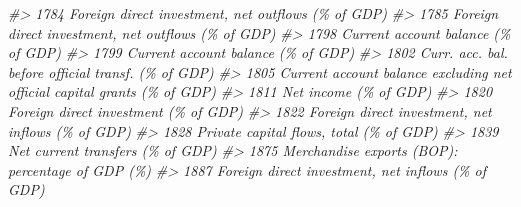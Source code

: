 \documentclass[
]{bxjsbook}
\newenvironment{Shaded}{\begin{snugshade}}{\end{snugshade}}
\newcommand{\CommentTok}[1]{\textcolor[rgb]{0.56,0.35,0.01}{\textit{#1}}}
\theoremstyle{definition}
\theoremstyle{definition}
\theoremstyle{definition}
\theoremstyle{definition}
\theoremstyle{remark}
\begin{document}
\begin{Shaded}
\begin{Highlighting}[]
\CommentTok{\#\textgreater{} 1784                                                                                                                         Foreign direct investment, net outflows (\% of GDP)}
\CommentTok{\#\textgreater{} 1785                                                                                                                         Foreign direct investment, net outflows (\% of GDP)}
\CommentTok{\#\textgreater{} 1798                                                                                                                                         Current account balance (\% of GDP)}
\CommentTok{\#\textgreater{} 1799                                                                                                                                         Current account balance (\% of GDP)}
\CommentTok{\#\textgreater{} 1802                                                                                                                         Curr. acc. bal. before official transf. (\% of GDP)}
\CommentTok{\#\textgreater{} 1805                                                                                                   Current account balance excluding net official capital grants (\% of GDP)}
\CommentTok{\#\textgreater{} 1811                                                                                                                                                      Net income (\% of GDP)}
\CommentTok{\#\textgreater{} 1820                                                                                                                                       Foreign direct investment (\% of GDP)}
\CommentTok{\#\textgreater{} 1822                                                                                                                          Foreign direct investment, net inflows (\% of GDP)}
\CommentTok{\#\textgreater{} 1828                                                                                                                                    Private capital flows, total (\% of GDP)}
\CommentTok{\#\textgreater{} 1839                                                                                                                                           Net current transfers (\% of GDP)}
\CommentTok{\#\textgreater{} 1875                                                                                                                           Merchandise exports (BOP): percentage of GDP (\%)}
\CommentTok{\#\textgreater{} 1887                                                                                                                          Foreign direct investment, net inflows (\% of GDP)}

\end{Highlighting}
\end{Shaded}
\end{document}
